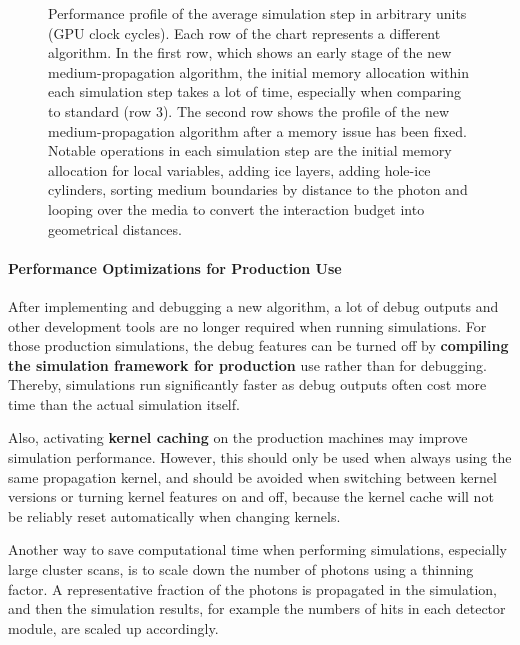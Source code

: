 
\begin{figure}[htbp]
  \caption{Performance profile of the average simulation step in arbitrary units (GPU clock cycles). Each row of the chart represents a different algorithm. In the first row, which shows an early stage of the new medium-propagation algorithm, the initial memory allocation within each simulation step takes a lot of time, especially when comparing to standard \clsim (row 3). The second row shows the profile of the new medium-propagation algorithm after a memory issue has been fixed. Notable operations in each simulation step are the initial memory allocation for local variables, adding ice layers, adding hole-ice cylinders, sorting medium boundaries by distance to the photon and looping over the media to convert the interaction budget into geometrical distances.}
  \label{fig:profiling-paz4Eig6}
\end{figure}


\paragraph{Performance Optimizations for Production Use}
After implementing and debugging a new algorithm, a lot of debug outputs and other development tools are no longer required when running simulations. For those production simulations, the debug features can be turned off by \textbf{compiling the \icecube simulation framework for production} use rather than for debugging. Thereby, simulations run significantly faster as debug outputs often cost more time than the actual simulation itself.


Also, activating \textbf{kernel caching} on the production machines may improve simulation performance. However, this should only be used when always using the same propagation kernel, and should be avoided when switching between kernel versions or turning kernel features on and off, because the kernel cache will not be reliably reset automatically when changing kernels.


\label{sec:thinning}
Another way to save computational time when performing simulations, especially large cluster scans, is to scale down the number of photons using a thinning factor. A representative fraction of the photons is propagated in the simulation, and then the simulation results, for example the numbers of hits in each detector module, are scaled up accordingly.

